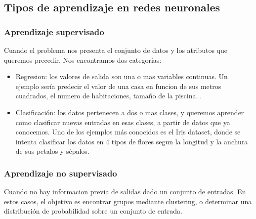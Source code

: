 \subsection{Tipos de aprendizaje en redes neuronales}
\subsubsection {Aprendizaje supervisado} 
Cuando el problema nos presenta el conjunto de datos y los atributos que queremos precedir. Nos encontramos dos categorias:
\begin{itemize}
\item Regresion: los valores de salida son una o mas variables continuas. Un ejemplo sería predecir el valor de una casa en funcion de sus metros cuadrados, el numero de habitaciones, tamaño de la piscina...
\item Clasificación: los datos pertenecen a dos o mas clases, y queremos aprender como clasificar nuevas entradas en esas clases, a partir de datos que ya conocemos. Uno de los ejemplos más conocidos es el Iris dataset, donde se intenta clasificar los datos en 4 tipos de flores segun la longitud y la anchura de sus petalos y sépalos.
\end{itemize}
\subsubsection {Aprendizaje no supervisado} 
Cuando no hay informacion previa de salidas dado un conjunto de entradas. En estos casos, el objetivo es encontrar grupos mediante clustering, o determinar una distribución de probabilidad sobre un conjunto de entrada.



